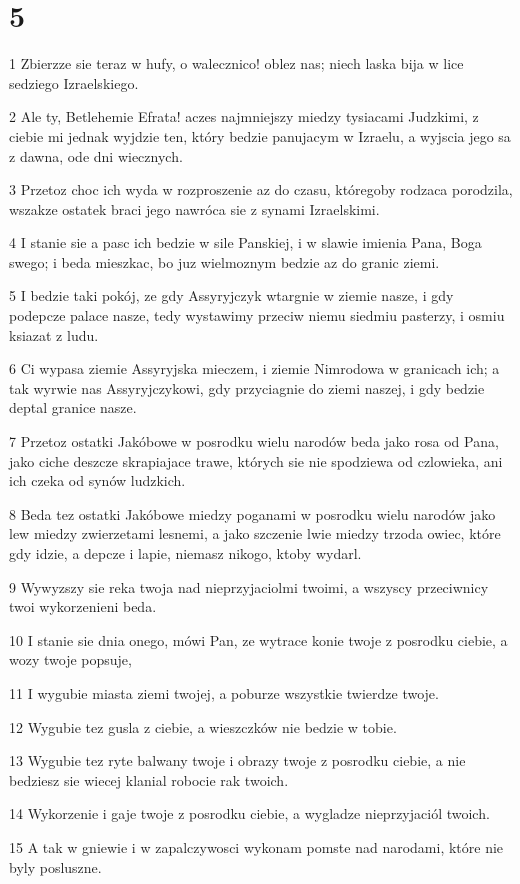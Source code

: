 \chapter{5}

\par 1 Zbierzze sie teraz w hufy, o walecznico! oblez nas; niech laska bija w lice sedziego Izraelskiego.
\par 2 Ale ty, Betlehemie Efrata! aczes najmniejszy miedzy tysiacami Judzkimi, z ciebie mi jednak wyjdzie ten, który bedzie panujacym w Izraelu, a wyjscia jego sa z dawna, ode dni wiecznych.
\par 3 Przetoz choc ich wyda w rozproszenie az do czasu, któregoby rodzaca porodzila, wszakze ostatek braci jego nawróca sie z synami Izraelskimi.
\par 4 I stanie sie a pasc ich bedzie w sile Panskiej, i w slawie imienia Pana, Boga swego; i beda mieszkac, bo juz wielmoznym bedzie az do granic ziemi.
\par 5 I bedzie taki pokój, ze gdy Assyryjczyk wtargnie w ziemie nasze, i gdy podepcze palace nasze, tedy wystawimy przeciw niemu siedmiu pasterzy, i osmiu ksiazat z ludu.
\par 6 Ci wypasa ziemie Assyryjska mieczem, i ziemie Nimrodowa w granicach ich; a tak wyrwie nas Assyryjczykowi, gdy przyciagnie do ziemi naszej, i gdy bedzie deptal granice nasze.
\par 7 Przetoz ostatki Jakóbowe w posrodku wielu narodów beda jako rosa od Pana, jako ciche deszcze skrapiajace trawe, których sie nie spodziewa od czlowieka, ani ich czeka od synów ludzkich.
\par 8 Beda tez ostatki Jakóbowe miedzy poganami w posrodku wielu narodów jako lew miedzy zwierzetami lesnemi, a jako szczenie lwie miedzy trzoda owiec, które gdy idzie, a depcze i lapie, niemasz nikogo, ktoby wydarl.
\par 9 Wywyzszy sie reka twoja nad nieprzyjaciolmi twoimi, a wszyscy przeciwnicy twoi wykorzenieni beda.
\par 10 I stanie sie dnia onego, mówi Pan, ze wytrace konie twoje z posrodku ciebie, a wozy twoje popsuje,
\par 11 I wygubie miasta ziemi twojej, a poburze wszystkie twierdze twoje.
\par 12 Wygubie tez gusla z ciebie, a wieszczków nie bedzie w tobie.
\par 13 Wygubie tez ryte balwany twoje i obrazy twoje z posrodku ciebie, a nie bedziesz sie wiecej klanial robocie rak twoich.
\par 14 Wykorzenie i gaje twoje z posrodku ciebie, a wygladze nieprzyjaciól twoich.
\par 15 A tak w gniewie i w zapalczywosci wykonam pomste nad narodami, które nie byly posluszne.

